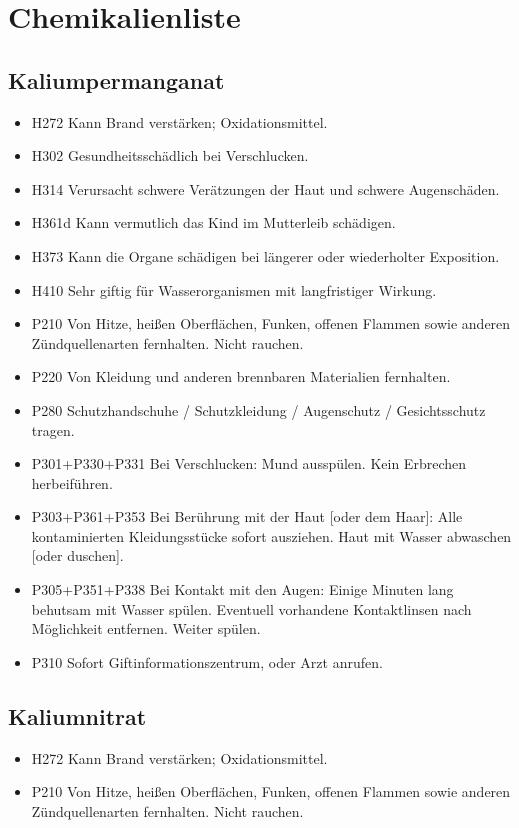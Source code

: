 \section{Chemikalienliste}
\subsection{Kaliumpermanganat}
\begin{itemize}
\item H272 Kann Brand verstärken; Oxidationsmittel.\\
\item H302 Gesundheitsschädlich bei Verschlucken.\\
\item H314 Verursacht schwere Verätzungen der Haut und schwere Augenschäden.\\
\item H361d Kann vermutlich das Kind im Mutterleib schädigen.\\
\item H373 Kann die Organe schädigen bei längerer oder wiederholter Exposition.
\item H410 Sehr giftig für Wasserorganismen mit langfristiger Wirkung.\\
\item P210 Von Hitze, heißen Oberflächen, Funken, offenen Flammen sowie anderen Zündquellenarten fernhalten. Nicht rauchen.\\
\item P220 Von Kleidung und anderen brennbaren Materialien fernhalten. \\
\item P280 Schutzhandschuhe / Schutzkleidung / Augenschutz / Gesichtsschutz tragen.\\
\item P301+P330+P331 Bei Verschlucken: Mund ausspülen. Kein Erbrechen herbeiführen. 
\item P303+P361+P353 Bei Berührung mit der Haut [oder dem Haar]: Alle kontaminierten Kleidungsstücke sofort ausziehen. Haut mit Wasser abwaschen [oder duschen]. 
\item P305+P351+P338 Bei Kontakt mit den Augen: Einige Minuten lang behutsam mit Wasser spülen. Eventuell vorhandene Kontaktlinsen nach Möglichkeit entfernen. Weiter spülen.
\item P310 Sofort Giftinformationszentrum, oder Arzt anrufen.\\
\end{itemize}

\subsection{Kaliumnitrat}
\begin{itemize}
\item H272 Kann Brand verstärken; Oxidationsmittel.\\
\item P210 Von Hitze, heißen Oberflächen, Funken, offenen Flammen sowie anderen Zündquellenarten fernhalten. Nicht rauchen.\\
\end{itemize}
